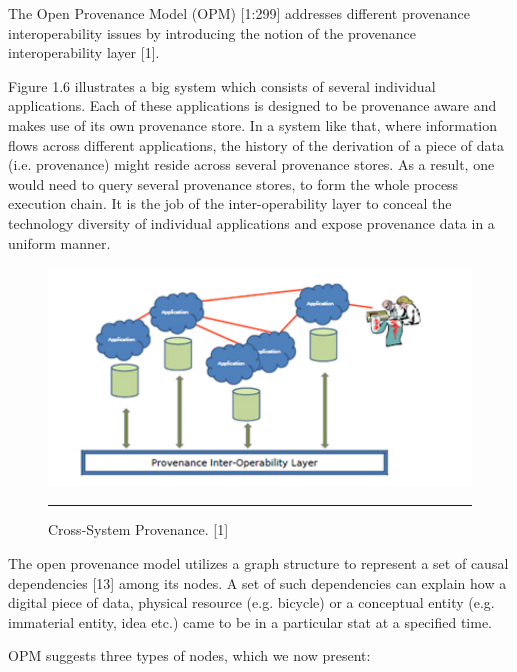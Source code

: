 The Open Provenance Model (OPM) [1:299] addresses different provenance interoperability issues by introducing the notion of the provenance interoperability layer [1].

Figure 1.6 illustrates a big system which consists of several individual applications. Each of these applications is designed to be provenance aware and makes use of its own provenance store. In a system like that, where information flows across different applications, the history of the derivation of a piece of data (i.e. provenance) might reside across several provenance stores. As a result, one would need to query several provenance stores, to form the whole process execution chain. It is the job of the inter-operability layer to conceal the technology diversity of individual applications and expose provenance data in a uniform manner.

\begin{figure}[htbp]
	\centering
		\includegraphics{./Figures/figure6.pdf}
		\rule{35em}{0.5pt}
	\caption[Cross-System Provenance]{Cross-System Provenance. [1]}
	\label{fig:provAccrossSystems}
\end{figure}

The open provenance model utilizes a graph structure to represent a set of causal dependencies [13] among its nodes. A set of such dependencies can explain how a digital piece of data, physical resource (e.g. bicycle) or a conceptual entity (e.g. immaterial entity, idea etc.) came to be in a particular stat at a specified time.

OPM suggests three types of nodes, which we now present:


